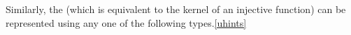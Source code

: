 \begin{code}
\AgdaSpace{}%
\AgdaSpace{}%
\AgdaSpace{}%
\<%
\\
%
\>[1]\AgdaSpace{}%
\AgdaSpace{}%
\AgdaSymbol{=}\AgdaSpace{}%
\AgdaSpace{}%
\AgdaSpace{}%
\AgdaSpace{}%
\AgdaSpace{}%
\AgdaFunction{,}\AgdaSpace{}%
\AgdaSpace{}%
\AgdaSpace{}%
\AgdaSpace{}%
\AgdaSpace{}%
\AgdaFunction{,}\AgdaSpace{}%
\AgdaSpace{}%
\AgdaSpace{}%
\AgdaSpace{}%
\AgdaSpace{}%
\<%
\\
%
\\[\AgdaEmptyExtraSkip]%
%
\>[1]\AgdaSpace{}%
\AgdaSymbol{:}\AgdaSpace{}%
\AgdaSymbol{(}\AgdaSpace{}%
\AgdaSpace{}%
\AgdaSymbol{)}\AgdaSpace{}%
\AgdaSpace{}%
\AgdaSpace{}%
\AgdaSpace{}%
\AgdaSpace{}%
\<%
\\
%
\>[1]\AgdaSpace{}%
\AgdaSpace{}%
\AgdaSymbol{=}\AgdaSpace{}%
\AgdaSpace{}%
\AgdaSpace{}%
\AgdaBound{,}\AgdaSpace{}%
\AgdaSpace{}%
\AgdaSpace{}%
\AgdaSymbol{(}\AgdaSpace{}%
\AgdaSpace{}%
\AgdaSymbol{)}\AgdaSpace{}%
\AgdaFunction{,}\AgdaSpace{}%
\AgdaSpace{}%
\AgdaSpace{}%
\AgdaSpace{}%
\AgdaSpace{}%
\<%
\end{code}
\ccpad
Similarly, the  (which is equivalent to the kernel of an injective function) can be represented using any one of the following types.\cref{uhints}
\ccpad
